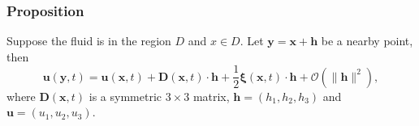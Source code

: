 \subsubsection{Proposition} %

Suppose the fluid is in the region $D$ and $x\in D$. Let $\textbf{y} = \textbf{x} + \textbf{h}$ be a nearby point, then
\begin{equation}
\textbf{u}(\textbf{y},t) = \textbf{u}(\textbf{x},t) + \textbf{D}(\textbf{x},t)\cdot \textbf{h} + \frac{1}{2}\mathbf{\xi}(\textbf{x},t)\cdot \textbf{h} + \mathcal{O}\left(\lVert \textbf{h}\rVert^2\right),
\end{equation}
where $\textbf{D}(\textbf{x},t)$ is a symmetric $3\times 3$ matrix, $\textbf{h}=(h_1,h_2,h_3)$ and $\textbf{u}=(u_1,u_2,u_3)$.


